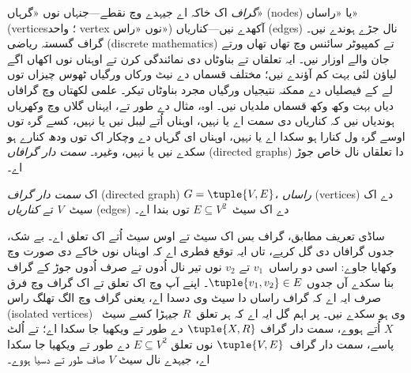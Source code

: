 \documentclass[../../../include/open-logic-section]{subfiles}
\begin{document}

\emph{گراف} اک خاکہ اے جیہدے وچ نقطے---جنہاں نوں «گرہاں» (nodes) یا
«راساں» (vertices؛ واحد vertex نوں «راس») آکھدے نیں---کناریاں (edges)
نال جڑے ہوندے نیں۔ گراف گسستہ ریاضی (discrete mathematics) تے کمپیوٹر
سائنس وچ تھاں تھاں ورتے جان والے اوزار نیں۔ ایہ
تعلقاں تے بناوٹاں دی نمائندگی کرن تے اوہناں نوں اکھاں اگے لیاؤن لئی
بہت کم آؤندے نیں؛ مختلف قسماں دے نیٹ ورکاں ورگیاں ٹھوس چیزاں توں لے کے
فیصلیاں دے ممکنہ نتیجیاں ورگیاں مجرد بناوٹاں تیکر۔ علمی لکھتاں وچ
گرافاں دیاں بہت وکھ وکھ قسماں ملدیاں نیں۔ اوہ، مثال دے طور تے، ایہناں
گلاں وچ وکھریاں ہوندیاں نیں کہ کناریاں دی سمت اے یا نہیں، اوہناں اُتے
لیبل نیں یا نہیں، کسے گرہ توں اوسے گرہ ول کنارا ہو سکدا اے یا نہیں،
اوہناں ای گرہاں دے وچکار اک توں ودھ کنارے ہو سکدے نیں یا نہیں، وغیرہ۔
\emph{سمت دار گرافاں} (directed graphs) دا تعلقاں نال خاص جوڑ اے۔

\begin{defn}
اک \emph{سمت دار گراف} (directed graph) $G = \tuple{V, E}$،
\emph{راساں} (vertices) دے اک سیٹ~$V$ تے \emph{کناریاں} (edges) دے اک
سیٹ~$E \subseteq V^2$ توں بندا اے۔
\end{defn}

\begin{explain}
ساڈی تعریف مطابق، گراف بس اک سیٹ تے اوس سیٹ اُتے اک تعلق اے۔ بے شک،
جدوں گرافاں دی گل کریے، تاں ایہ توقع فطری اے کہ اوہناں نوں خاکے دی
صورت وچ وکھایا جاوے: اسی دو راساں~$v_1$ تے $v_2$ نوں تیر نال اُدوں
تے صرف اُدوں جوڑ کے گراف بنا سکدے آں جدوں $\tuple{v_1, v_2} \in E$۔
اپنے آپ وچ اک تعلق تے اک گراف وچ فرق صرف ایہ اے کہ گراف راساں دا
سیٹ وی دسدا اے، یعنی گراف وچ الگ تھلگ راس (isolated vertices) وی ہو
سکدے نیں۔ پر اہم گل
ایہ اے کہ ہر تعلق~$R$ جیہڑا کسے سیٹ~$X$ اُتے ہووے، سمت دار گراف
$\tuple{X, R}$ دے طور تے ویکھیا جا سکدا اے؛ تے اُلٹ پاسے، سمت دار
گراف~$\tuple{V, E}$ نوں تعلق $E \subseteq V^2$ دے طور تے ویکھیا جا سکدا
اے، جیہدے نال سیٹ $V$ صاف طور تے دسیا ہووے۔
\end{explain}
\end{document}
